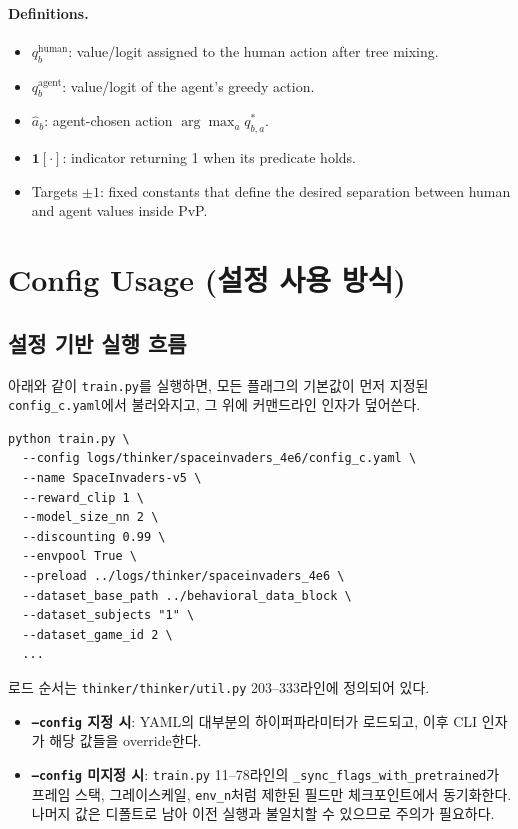 \documentclass{article}
\begin{document}
\paragraph{Definitions.}
\begin{itemize}
  \item $q^{\text{human}}_b$: value/logit assigned to the human action after tree mixing.
  \item $q^{\text{agent}}_b$: value/logit of the agent’s greedy action.
  \item $\hat{a}_b$: agent-chosen action $\arg\max_a q^{\ast}_{b,a}$.
  \item $\mathbf{1}[\cdot]$: indicator returning 1 when its predicate holds.
  \item Targets $\pm 1$: fixed constants that define the desired separation between human and agent values inside PvP.
\end{itemize}

\section{Config Usage (설정 사용 방식)}
\subsection{설정 기반 실행 흐름}
\noindent 아래와 같이 \texttt{train.py}를 실행하면, 모든 플래그의 기본값이 먼저 지정된 \texttt{config\_c.yaml}에서 불러와지고, 그 위에 커맨드라인 인자가 덮어쓴다.
\begin{verbatim}
python train.py \
  --config logs/thinker/spaceinvaders_4e6/config_c.yaml \
  --name SpaceInvaders-v5 \
  --reward_clip 1 \
  --model_size_nn 2 \
  --discounting 0.99 \
  --envpool True \
  --preload ../logs/thinker/spaceinvaders_4e6 \
  --dataset_base_path ../behavioral_data_block \
  --dataset_subjects "1" \
  --dataset_game_id 2 \
  ...
\end{verbatim}
\noindent 로드 순서는 \texttt{thinker/thinker/util.py} 203–333라인에 정의되어 있다.
\begin{itemize}
  \item \textbf{\texttt{--config} 지정 시}: YAML의 대부분의 하이퍼파라미터가 로드되고, 이후 CLI 인자가 해당 값들을 override한다.
  \item \textbf{\texttt{--config} 미지정 시}: \texttt{train.py} 11–78라인의 \texttt{\_sync\_flags\_with\_pretrained}가 프레임 스택, 그레이스케일, \texttt{env\_n}처럼 제한된 필드만 체크포인트에서 동기화한다. 나머지 값은 디폴트로 남아 이전 실행과 불일치할 수 있으므로 주의가 필요하다.
\end{itemize}
\end{document}
